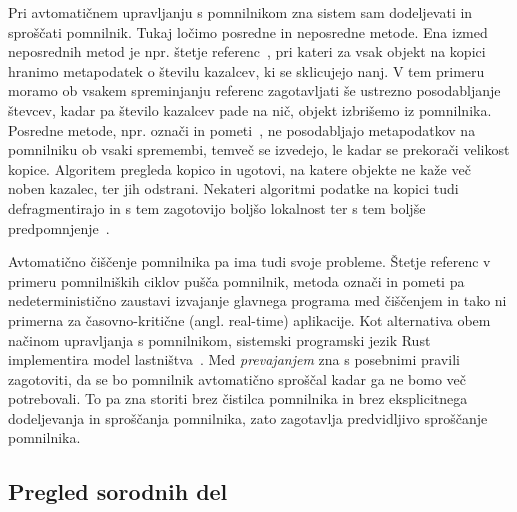\documentclass[a4paper, 12pt]{article}
\begin{document}
Pri avtomatičnem upravljanju s pomnilnikom zna sistem sam dodeljevati in sproščati pomnilnik. Tukaj ločimo posredne in neposredne metode. Ena izmed neposrednih metod je npr. štetje referenc~\cite{collins1960method}, pri kateri za vsak objekt na kopici hranimo metapodatek o številu kazalcev, ki se sklicujejo nanj. V tem primeru moramo ob vsakem spreminjanju referenc zagotavljati še ustrezno posodabljanje števcev, kadar pa število kazalcev pade na nič, objekt izbrišemo iz pomnilnika. Posredne metode, npr. označi in pometi~\cite{mccarthy1960recursive}, ne posodabljajo metapodatkov na pomnilniku ob vsaki spremembi, temveč se izvedejo, le kadar se prekorači velikost kopice. Algoritem pregleda kopico in ugotovi, na katere objekte ne kaže več noben kazalec, ter jih odstrani. Nekateri algoritmi podatke na kopici tudi defragmentirajo in s tem zagotovijo boljšo lokalnost ter s tem boljše predpomnjenje~\cite{fenichel1969lisp}. 

Avtomatično čiščenje pomnilnika pa ima tudi svoje probleme. Štetje referenc v primeru pomnilniških ciklov pušča pomnilnik, metoda označi in pometi pa nedeterministično zaustavi izvajanje glavnega programa med čiščenjem in tako ni primerna za časovno-kritične (angl. real-time) aplikacije. Kot alternativa obem načinom upravljanja s pomnilnikom, sistemski programski jezik Rust implementira model lastništva~\cite{klabnik2023rust}. Med \textit{prevajanjem} zna s posebnimi pravili zagotoviti, da se bo pomnilnik avtomatično sproščal kadar ga ne bomo več potrebovali. To pa zna storiti brez čistilca pomnilnika in brez eksplicitnega dodeljevanja in sproščanja pomnilnika, zato zagotavlja predvidljivo sproščanje pomnilnika.

\subsection{Pregled sorodnih del}


\end{document}
